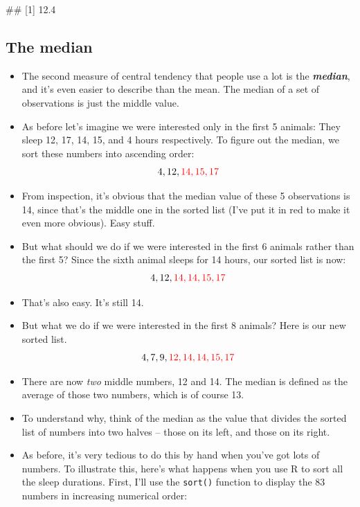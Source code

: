 \documentclass[
]{book}
\newenvironment{Shaded}{\begin{snugshade}}{\end{snugshade}}
\newcommand{\NormalTok}[1]{#1}
\begin{document}
\begin{Shaded}
\begin{Highlighting}[]
\NormalTok{\#\# [1] 12.4}
\end{Highlighting}
\end{Shaded}

\hypertarget{median}{%
\subsection{The median}\label{median}}

\begin{itemize}
\item
  The second measure of central tendency that people use a lot is the \textbf{\emph{median}}, and it's even easier to describe than the mean. The median of a set of observations is just the middle value.
\item
  As before let's imagine we were interested only in the first 5 animals: They sleep 12, 17, 14, 15, and 4 hours respectively. To figure out the median, we sort these numbers into ascending order:
  \[
  4, 12, \color{red}{14}, 15, 17
  \]
\item
  From inspection, it's obvious that the median value of these 5 observations is 14, since that's the middle one in the sorted list (I've put it in red to make it even more obvious). Easy stuff.
\item
  But what should we do if we were interested in the first 6 animals rather than the first 5? Since the sixth animal sleeps for 14 hours, our sorted list is now:
  \[
  4, 12, \color{red}{14}, \color{red}{14}, 15, 17
  \]
\item
  That's also easy. It's still 14.
\item
  But what we do if we were interested in the first 8 animals? Here is our new sorted list.
  \[
  4,  7,  9, \color{red}{12}, \color{red}{14}, 14, 15, 17
  \]
\item
  There are now \emph{two} middle numbers, 12 and 14. The median is defined as the average of those two numbers, which is of course 13.
\item
  To understand why, think of the median as the value that divides the sorted list of numbers into two halves -- those on its left, and those on its right.
\item
  As before, it's very tedious to do this by hand when you've got lots of numbers. To illustrate this, here's what happens when you use R to sort all the sleep durations. First, I'll use the \texttt{sort()} function to display the 83 numbers in increasing numerical order:
\end{itemize}
\end{document}
